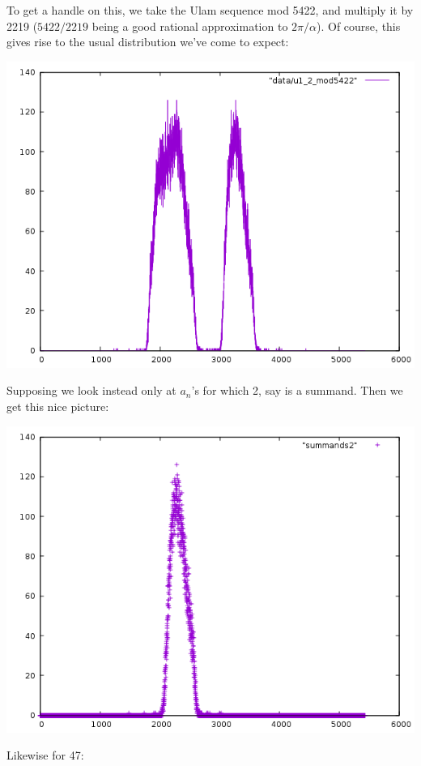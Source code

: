 \documentclass{article}
\theoremstyle{definition}
\theoremstyle{remark}
\numberwithin{equation}{section}
\begin{document}
{To get a handle on this, we take the Ulam sequence mod 5422, and
multiply it by 2219 ($5422/2219$ being a good rational approximation
to $2\pi/\alpha$).  Of course, this gives rise to the usual
distribution we've come to expect:

\includegraphics[scale=0.5]{../figs/u1_2_mod5422.png}

Supposing we look instead only at $a_n$'s for which 2, say is a summand.  Then we get this nice picture:

\includegraphics[scale=0.5]{../figs/summands2.png}

Likewise for 47:

}
\end{document}
